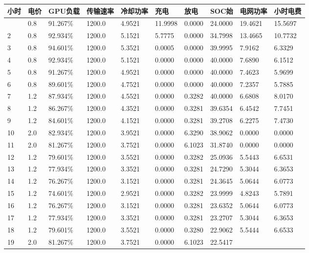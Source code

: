 \documentclass[
]{article}
\begin{document}
\begin{longtable}[]{@{}llllllllll@{}}
\toprule\noalign{}
小时 & 电价 & GPU负载 & 传输速率 & 冷却功率 & 充电 & 放电 & SOC始 &
电网功率 & 小时电费 \\
\midrule\noalign{}
\endhead
\bottomrule\noalign{}
\endlastfoot
1 & 0.8 & 91.267\% & 1200.0 & 4.9521 & 11.9998 & 0.0000 & 24.0000 &
19.4621 & 15.5697 \\
2 & 0.8 & 92.934\% & 1200.0 & 5.1521 & 5.7775 & 0.0000 & 34.7998 &
13.4665 & 10.7732 \\
3 & 0.8 & 94.601\% & 1200.0 & 5.3521 & 0.0005 & 0.0000 & 39.9995 &
7.9162 & 6.3329 \\
4 & 0.8 & 92.934\% & 1200.0 & 5.1521 & 0.0000 & 0.0000 & 40.0000 &
7.6890 & 6.1512 \\
5 & 0.8 & 91.267\% & 1200.0 & 4.9521 & 0.0000 & 0.0000 & 40.0000 &
7.4623 & 5.9699 \\
6 & 0.8 & 89.601\% & 1200.0 & 4.7521 & 0.0000 & 0.0000 & 40.0000 &
7.2357 & 5.7885 \\
7 & 1.2 & 87.934\% & 1200.0 & 4.5521 & 0.0000 & 0.3282 & 40.0000 &
6.6808 & 8.0170 \\
8 & 1.2 & 86.267\% & 1200.0 & 4.3521 & 0.0000 & 0.3281 & 39.6354 &
6.4542 & 7.7451 \\
9 & 1.2 & 84.601\% & 1200.0 & 4.1521 & 0.0000 & 0.3281 & 39.2708 &
6.2275 & 7.4730 \\
10 & 2.0 & 82.934\% & 1200.0 & 3.9521 & 0.0000 & 6.3290 & 38.9062 &
0.0000 & 0.0000 \\
11 & 2.0 & 81.267\% & 1200.0 & 3.7521 & 0.0000 & 6.1023 & 31.8740 &
0.0000 & 0.0000 \\
12 & 1.2 & 79.601\% & 1200.0 & 3.5521 & 0.0000 & 0.3282 & 25.0936 &
5.5443 & 6.6531 \\
13 & 1.2 & 77.934\% & 1200.0 & 3.3521 & 0.0000 & 0.3281 & 24.7290 &
5.3044 & 6.3653 \\
14 & 1.2 & 76.267\% & 1200.0 & 3.1521 & 0.0000 & 0.3281 & 24.3645 &
5.0644 & 6.0773 \\
15 & 1.2 & 74.601\% & 1200.0 & 2.9521 & 0.0000 & 0.3282 & 23.9999 &
4.8243 & 5.7891 \\
16 & 1.2 & 76.267\% & 1200.0 & 3.1521 & 0.0000 & 0.3281 & 23.6352 &
5.0644 & 6.0773 \\
17 & 1.2 & 77.934\% & 1200.0 & 3.3521 & 0.0000 & 0.3281 & 23.2707 &
5.3044 & 6.3653 \\
18 & 1.2 & 79.601\% & 1200.0 & 3.5521 & 0.0000 & 0.3280 & 22.9062 &
5.5444 & 6.6533 \\
19 & 2.0 & 81.267\% & 1200.0 & 3.7521 & 0.0000 & 6.1023 & 22.5417 &

\end{longtable}
\end{document}
